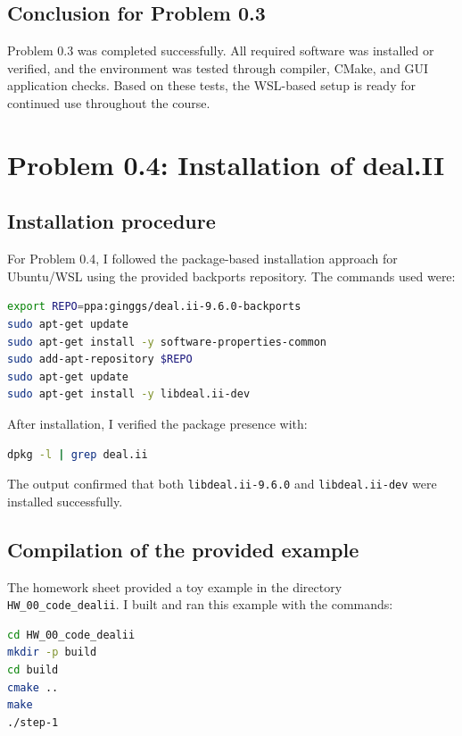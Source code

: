 \documentclass[11pt,a4paper]{article}
\begin{document}
\subsection{Conclusion for Problem 0.3}
Problem 0.3 was completed successfully. All required software was installed or verified, and the environment was tested through compiler, CMake, and GUI application checks. Based on these tests, the WSL-based setup is ready for continued use throughout the course.

\pagebreak

\section{Problem 0.4: Installation of deal.II}
\subsection{Installation procedure}
For Problem 0.4, I followed the package-based installation approach for Ubuntu/WSL using the provided backports repository. The commands used were:

\begin{lstlisting}[language=bash]
export REPO=ppa:ginggs/deal.ii-9.6.0-backports
sudo apt-get update
sudo apt-get install -y software-properties-common
sudo add-apt-repository $REPO
sudo apt-get update
sudo apt-get install -y libdeal.ii-dev
\end{lstlisting}

After installation, I verified the package presence with:

\begin{lstlisting}[language=bash]
dpkg -l | grep deal.ii
\end{lstlisting}

The output confirmed that both \texttt{libdeal.ii-9.6.0} and \texttt{libdeal.ii-dev} were installed successfully.

\subsection{Compilation of the provided example}
The homework sheet provided a toy example in the directory \texttt{HW\_00\_code\_dealii}. I built and ran this example with the commands:

\begin{lstlisting}[language=bash]
cd HW_00_code_dealii
mkdir -p build
cd build
cmake ..
make
./step-1
\end{lstlisting}
\end{document}
